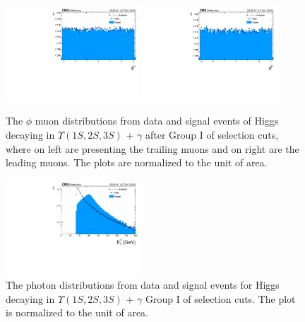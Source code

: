 \begin{figure}[!htbp]
\begin{center}
\includegraphics[width=0.45\textwidth]{figures_and_tables/outputPlots/HtoUpsilon_Cat0_ZZZZZ/au/data_x_mc/noKinCuts/h_noKin_TrailingMu_phi}\hspace*{1.cm}
\includegraphics[width=0.45\textwidth]{figures_and_tables/outputPlots/HtoUpsilon_Cat0_ZZZZZ/au/data_x_mc/noKinCuts/h_noKin_LeadingMu_phi}
\end{center}\vspace*{-.5cm}
\caption{The $\phi$ muon distributions from data and signal events of Higgs decaying in $\Upsilon(1S,2S,3S)$ + $\gamma$ after Group I of selection cuts, where on left are presenting the trailing muons and on right are the leading muons. The plots are normalized to the unit of area.}
\label{fig:phiMuons_HtoUpsilon_Cat0}
\end{figure}


\begin{figure}[!htbp]
\begin{center}
\includegraphics[width=0.45\textwidth]{figures_and_tables/outputPlots/HtoUpsilon_Cat0_ZZZZZ/au/data_x_mc/noKinCuts/h_noKin_Photon_pt}\hspace*{1.cm}
\end{center}\vspace*{-.5cm}
\caption{The \PT photon distributions from data and signal events for Higgs decaying in $\Upsilon(1S,2S,3S)$ + $\gamma$ Group I of selection cuts. The plot is normalized to the unit of area.}
\label{fig:pTPhoton_HtoUpsilon_Cat0}
\end{figure}


